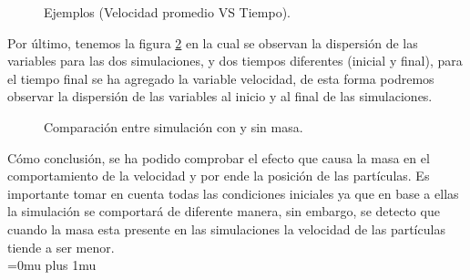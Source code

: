 \documentclass{article}
\begin{document}
\begin{figure}[H]
\centering
{}
\caption{Ejemplos (Velocidad promedio VS Tiempo).} 
\label{f2}
\end{figure}

Por último, tenemos la figura \ref{f3} en la cual se observan la dispersión de las variables para las dos simulaciones, y dos tiempos diferentes (inicial y final), para el tiempo final se ha agregado la variable velocidad, de esta forma podremos observar la dispersión de las variables al inicio y al final de las simulaciones.

\begin{figure}[H]
\centering
{}
\caption{Comparaci\'on entre simulaci\'on con y sin masa.} 
\label{f3}
\end{figure}


Cómo conclusión, se ha podido comprobar el efecto que causa la masa en el comportamiento de la velocidad y por ende la posición de las partículas. Es importante tomar en cuenta todas las condiciones iniciales ya que en base a ellas la simulación se comportará de diferente manera, sin embargo, se detecto que cuando la masa esta presente en las simulaciones la velocidad de las partículas tiende a ser menor.\\

\Urlmuskip=0mu plus 1mu\relax


\end{document}
